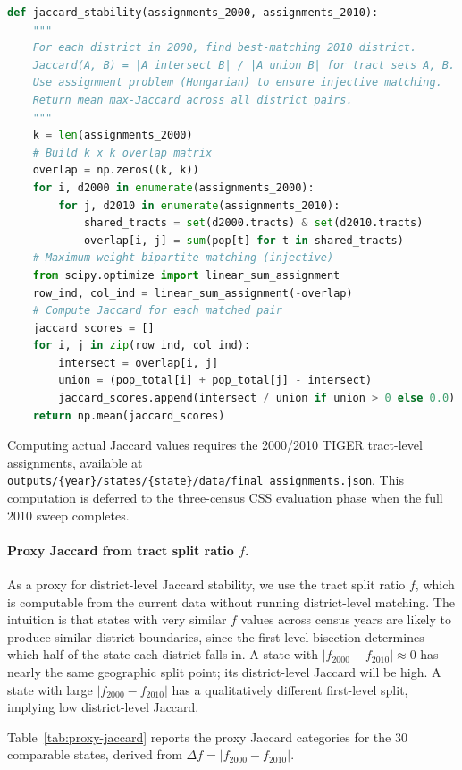 \begin{lstlisting}[language=Python, basicstyle=\small\ttfamily, caption={Jaccard stability pseudocode.}]
def jaccard_stability(assignments_2000, assignments_2010):
    """
    For each district in 2000, find best-matching 2010 district.
    Jaccard(A, B) = |A intersect B| / |A union B| for tract sets A, B.
    Use assignment problem (Hungarian) to ensure injective matching.
    Return mean max-Jaccard across all district pairs.
    """
    k = len(assignments_2000)
    # Build k x k overlap matrix
    overlap = np.zeros((k, k))
    for i, d2000 in enumerate(assignments_2000):
        for j, d2010 in enumerate(assignments_2010):
            shared_tracts = set(d2000.tracts) & set(d2010.tracts)
            overlap[i, j] = sum(pop[t] for t in shared_tracts)
    # Maximum-weight bipartite matching (injective)
    from scipy.optimize import linear_sum_assignment
    row_ind, col_ind = linear_sum_assignment(-overlap)
    # Compute Jaccard for each matched pair
    jaccard_scores = []
    for i, j in zip(row_ind, col_ind):
        intersect = overlap[i, j]
        union = (pop_total[i] + pop_total[j] - intersect)
        jaccard_scores.append(intersect / union if union > 0 else 0.0)
    return np.mean(jaccard_scores)
\end{lstlisting}

Computing actual Jaccard values requires the 2000/2010 TIGER tract-level
assignments, available at
\texttt{outputs/\{year\}/states/\{state\}/data/final\_assignments.json}.
This computation is deferred to the three-census CSS evaluation phase when
the full 2010 sweep completes.

\paragraph{Proxy Jaccard from tract split ratio $f$.}
As a proxy for district-level Jaccard stability, we use the tract split
ratio $f$, which is computable from the current data without running
district-level matching.
The intuition is that states with very similar $f$ values across census years
are likely to produce similar district boundaries, since the first-level
bisection determines which half of the state each district falls in.
A state with $|f_{2000} - f_{2010}| \approx 0$ has nearly the same geographic
split point; its district-level Jaccard will be high.
A state with large $|f_{2000} - f_{2010}|$ has a qualitatively different
first-level split, implying low district-level Jaccard.

Table~\ref{tab:proxy-jaccard} reports the proxy Jaccard categories for the
30 comparable states, derived from $\Delta f = |f_{2000} - f_{2010}|$.

